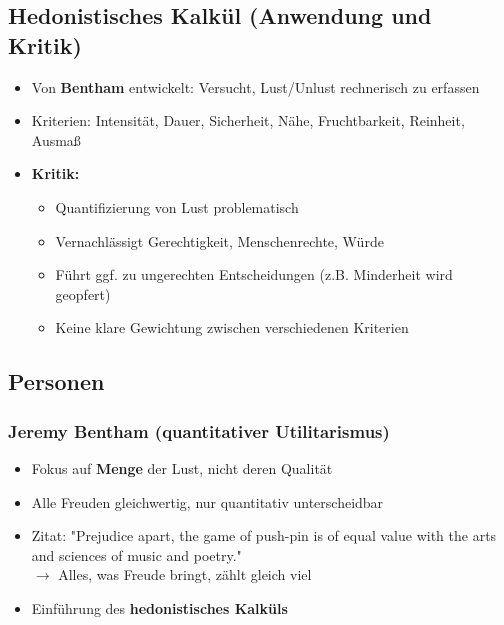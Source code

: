 \subsection{Hedonistisches Kalkül (Anwendung und Kritik)}
\begin{itemize}
    \item Von \textbf{Bentham} entwickelt: Versucht, Lust/Unlust rechnerisch zu erfassen
    \item Kriterien: Intensität, Dauer, Sicherheit, Nähe, Fruchtbarkeit, Reinheit, Ausmaß
    \item \textbf{Kritik:}
    \begin{itemize}
        \item Quantifizierung von Lust problematisch
        \item Vernachlässigt Gerechtigkeit, Menschenrechte, Würde
        \item Führt ggf. zu ungerechten Entscheidungen (z.B. Minderheit wird geopfert)
        \item Keine klare Gewichtung zwischen verschiedenen Kriterien
    \end{itemize}
\end{itemize}


\subsection{Personen}


\subsubsection{Jeremy Bentham (quantitativer Utilitarismus)}

\begin{itemize}
    \item Fokus auf \textbf{Menge} der Lust, nicht deren Qualität
    \item Alle Freuden gleichwertig, nur quantitativ unterscheidbar
    \item Zitat: "Prejudice apart, the game of push-pin is of equal value with the arts and sciences of music and poetry." \\
        $\rightarrow$ Alles, was Freude bringt, zählt gleich viel
    \item Einführung des \textbf{hedonistisches Kalküls}
\end{itemize}


